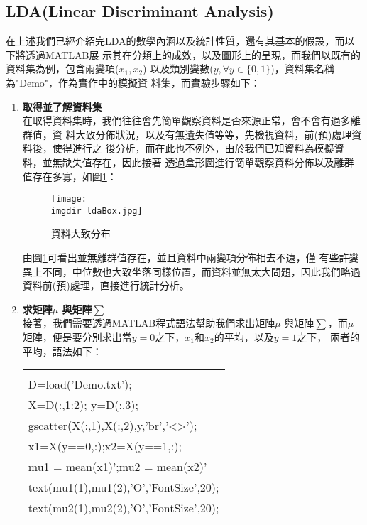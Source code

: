  		\subsection{LDA(Linear Discriminant Analysis)}
			在上述我們已經介紹完LDA的數學內涵以及統計性質，還有其基本的假設，而以下將透過MATLAB展				示其在分類上的成效，以及圖形上的呈現，而我們以既有的資料集為例，包含兩變項($x_1,x_2$)				以及類別變數($y, \forall y \in \{ 0,1\}$)，資料集名稱為"Demo"，作為實作中的模擬資				料集，而實驗步驟如下：			
			\begin{enumerate}[Step 1：]
				\item {\textbf{取得並了解資料集}\\
					在取得資料集時，我們往往會先簡單觀察資料是否來源正常，會不會有過多離群值，資						料大致分佈狀況，以及有無遺失值等等，先檢視資料，前(預)處理資料後，使得進行之						後分析，而在此也不例外，由於我們已知資料為模擬資料，並無缺失值存在，因此接著						透過盒形圖進行簡單觀察資料分佈以及離群值存在多寡，如圖\ref{fig:ldaBox}：
					\begin{figure}[H]	
		 		 		\centering	 			 	 
   				 		\texttt{[image: \\imgdir ldaBox.jpg]} 
   			 			\caption{資料大致分布}   		
   			 			\label{fig:ldaBox}   			 		 
					\end{figure}
					由圖\ref{fig:ldaBox}可看出並無離群值存在，並且資料中兩變項分佈相去不遠，僅						有些許變異上不同，中位數也大致坐落同樣位置，而資料並無太大問題，因此我們略過						資料前(預)處理，直接進行統計分析。
				}				
				\item {\textbf{求矩陣$\mu$ 與矩陣$\sum$ }\\
					接著，我們需要透過MATLAB程式語法幫助我們求出矩陣$\mu$ 與矩陣$\sum$，而$							\mu$矩陣，便是要分別求出當$y=0$之下，$x_1$和$x_2$的平均，以及$y=1$之下，						兩者的平均，語法如下：					
					\begin{center}\colorbox{slight}{
						\begin{tabular}{p{}}
							\MJHmarker{\textbf{\color{darkblue}{MATLAB語法 :}}}\\
							D=load('Demo.txt');\\
							X=D(:,1:2); y=D(:,3);\\
							gscatter(X(:,1),X(:,2),y,'br','<>');\\
							x1=X(y==0,:);x2=X(y==1,:);\\							
							mu1 = mean(x1)';mu2 = mean(x2)'\\
							text(mu1(1),mu1(2),'O','FontSize',20);\\
							text(mu2(1),mu2(2),'O','FontSize',20);\\

\end{tabular}}
\end{center}}
\end{enumerate}
